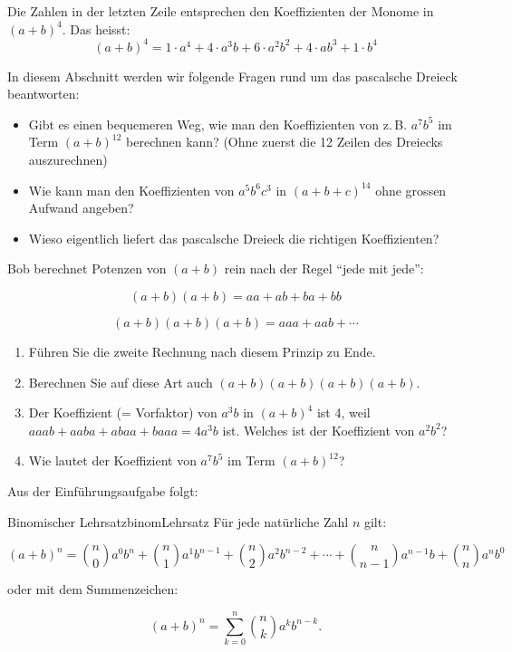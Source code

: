 Die Zahlen in der letzten Zeile entsprechen den Koeffizienten der Monome in \((a+b)^4\). Das heisst:
\[
    (a+b)^4 = 1 \cdot a^4 + 4 \cdot a^3 b + 6 \cdot a^2 b^2 + 4 \cdot ab^3 + 1 \cdot b^4
\]

In diesem Abschnitt werden wir folgende Fragen rund um das pascalsche Dreieck beantworten:
\begin{itemize}
    \item Gibt es einen bequemeren Weg, wie man den Koeffizienten von z.\,B. \(a^7 b^5\) im Term \((a+b)^{12}\) berechnen kann? (Ohne zuerst die 12 Zeilen des Dreiecks auszurechnen)
    \item Wie kann man den Koeffizienten von \(a^5 b^6 c^3\) in \((a+b+c)^{14}\) ohne grossen Aufwand angeben?
    \item Wieso eigentlich liefert das pascalsche Dreieck die richtigen Koeffizienten?
\end{itemize}



\begin{LA}
    {}{}
    Bob berechnet Potenzen von \((a+b)\) rein nach der Regel ``jede mit jede'':


    \[
        (a+b)(a+b) = aa + ab + ba + bb
    \]

    \[
        (a+b)(a+b)(a+b) = aaa + aab + \cdots
    \]

    \begin{enumerate}
        \item Führen Sie die zweite Rechnung nach diesem Prinzip zu Ende.
        \item Berechnen Sie auf diese Art auch \((a+b)(a+b)(a+b)(a+b)\).
        \item Der Koeffizient (= Vorfaktor) von \(a^3 b\) in \((a+b)^4\) ist 4, weil \(aaab + aaba + abaa + baaa = 4a^3 b\) ist. Welches ist der Koeffizient von \(a^2 b^2\)?
        \item Wie lautet der Koeffizient von \(a^7 b^5\) im Term \((a+b)^{12}\)?
    \end{enumerate}

\end{LA}

\clearpage

Aus der Einführungsaufgabe folgt:

\begin{satz}
    {Binomischer Lehrsatz}{binomLehrsatz}
    Für jede natürliche Zahl \(n\) gilt:

    \[
        (a+b)^n = \binom{n}{0} a^0 b^n + \binom{n}{1} a^1 b^{n-1} + \binom{n}{2} a^2 b^{n-2} + \cdots + \binom{n}{n-1} a^{n-1} b + \binom{n}{n} a^n b^0
    \]

    oder mit dem Summenzeichen:

    \[
        (a+b)^n = \sum_{k=0}^n \binom{n}{k} a^k b^{n-k}.
    \]
\end{satz}

